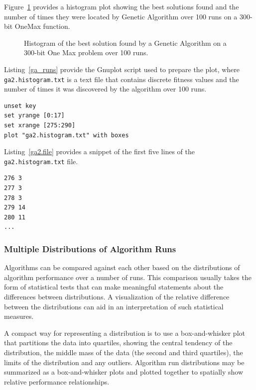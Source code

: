 Figure~\ref{plot:ga2} provides a histogram plot showing the best solutions found and the number of times they were located by Genetic Algorithm over 100 runs on a 300-bit OneMax function. 

\begin{figure}[htp]
\centering

\caption{Histogram of the best solution found by a Genetic Algorithm on a 300-bit One Max problem over 100 runs.}
\label{plot:ga2}
\end{figure}

Listing~\ref{ga_runs} provide the Gnuplot script used to prepare the plot, where \texttt{ga2.histogram.txt} is a text file that contains discrete fitness values and the number of times it was discovered by the algorithm over 100 runs.

\begin{lstlisting}[caption=Gnuplot script for creating a histogram of algorithm performance from multiple runs., label=ga_runs]
unset key
set yrange [0:17]
set xrange [275:290]
plot "ga2.histogram.txt" with boxes
\end{lstlisting}

Listing~\ref{ga2.file} provides a snippet of the first five lines of the \texttt{ga2.histogram.txt} file.

\begin{lstlisting}[caption=Snippet of the ga2.histogram.txt file., label=ga2.file]
276 3
277 3
278 3
279 14
280 11
...
\end{lstlisting}

\subsubsection{Multiple Distributions of Algorithm Runs}
Algorithms can be compared against each other based on the distributions of algorithm performance over a number of runs. This comparison usually takes the form of statistical tests that can make meaningful statements about the differences between distributions. A visualization of the relative difference between the distributions can aid in an interpretation of such statistical measures. 

A compact way for representing a distribution is to use a box-and-whisker plot that partitions the data into quartiles, showing the central tendency of the distribution, the middle mass of the data (the second and third quartiles), the limits of the distribution and any outliers. Algorithm run distributions may be summarized as a box-and-whisker plots and plotted together to spatially show relative performance relationships.


